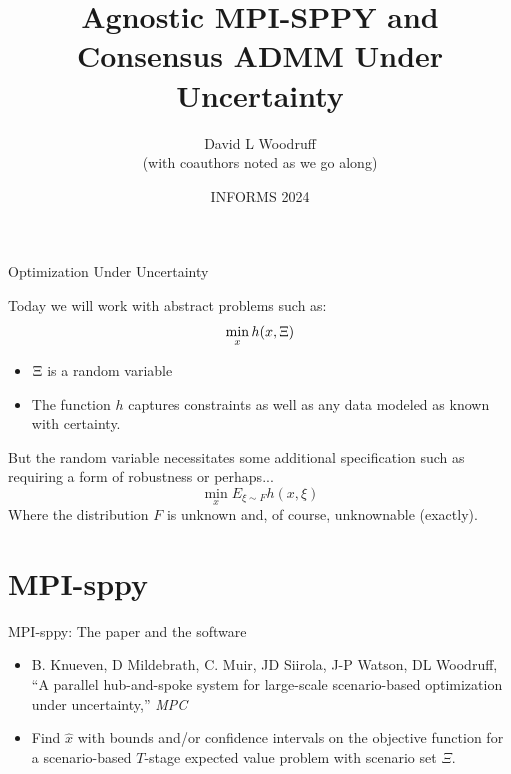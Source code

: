 \documentclass[9pt,usenames,dvipsnames]{beamer}
\title{Agnostic MPI-SPPY and Consensus ADMM Under Uncertainty}
\date{}
\author{David L Woodruff \inst{1}\\
(with coauthors noted as we go along)}
\institute{\inst{1} Graduate School of Management, \\ University of California, Davis}
\date{INFORMS 2024}
\begin{document}
\maketitle



\begin{frame}{Optimization Under Uncertainty}

Today we will work with abstract problems such as:
\alert{
\Large
$$
\min_x h(x,\boldmath\Xi)
$$}
\begin{itemize}
\item $\boldmath\Xi$ is a random variable
\item The function $h$ captures constraints as well as any data modeled as known with certainty.
\end{itemize}
But the random variable necessitates some additional specification such as
requiring a form of robustness or perhaps...
\pause
\alert{
\Large
\begin{equation}
        \min_x E_{\xi\sim F}h(x,\xi)  \label{eq:TheProblem}
\end{equation}
}
Where the distribution $F$ is unknown and, of course, unknownable (exactly). 
\end{frame}


\section{MPI-sppy}
\begin{frame}{MPI-sppy: The paper and the software}
\begin{itemize}
\item B. Knueven, D Mildebrath, C. Muir, JD Siirola, J-P Watson, DL Woodruff, ``A parallel hub-and-spoke system for large-scale scenario-based optimization under uncertainty,'' {\em MPC}
\item Find $\hat{x}$ with bounds and/or confidence intervals on the objective function for a scenario-based $T$-stage expected value problem with scenario set $\Xi$.
\end{itemize}
  
\end{frame}
\end{document}
